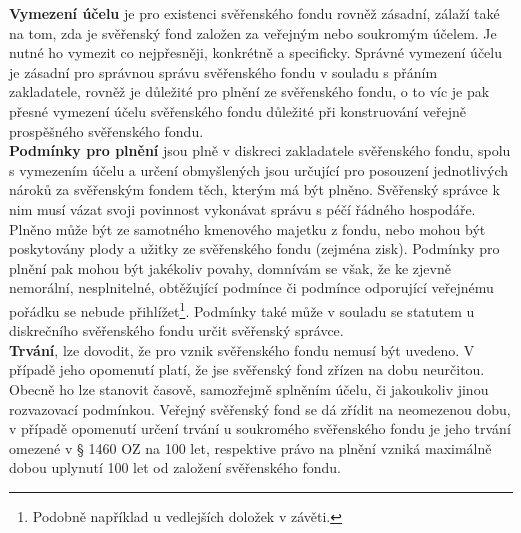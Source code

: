 \documentclass{article}
\begin{document}
\textbf{Vymezení účelu} je pro existenci svěřenského fondu rovněž zásadní, zálaží také na tom, zda je svěřenský fond založen za veřejným nebo soukromým účelem. Je nutné ho vymezit co nejpřesněji, konkrétně a specificky. Správné vymezení účelu je zásadní pro správnou správu svěřenského fondu v souladu s přáním zakladatele, rovněž je důležité pro plnění ze svěřenského fondu, o to víc je pak přesné vymezení účelu svěřenského fondu důležité při konstruování veřejně prospěšného svěřenského fondu.\\

\textbf{Podmínky pro plnění} jsou plně v diskreci zakladatele svěřenského fondu, spolu s vymezením účelu a určení obmyšlených jsou určující pro posouzení jednotlivých nároků za svěřenským fondem těch, kterým má být plněno. Svěřenský správce k nim musí vázat svoji povinnost vykonávat správu s péčí řádného hospodáře. Plněno může být ze samotného kmenového majetku z fondu, nebo mohou být poskytovány plody a užitky ze svěřenského fondu (zejména zisk). Podmínky pro plnění pak mohou být jakékoliv povahy, domnívám se však, že ke zjevně nemorální, nesplnitelné, obtěžující podmínce či podmínce odporující veřejnému pořádku se nebude přihlížet\footnote{Podobně například u vedlejších doložek v závěti.}. Podmínky také může v souladu se statutem u diskrečního svěřenského fondu určit svěřenský správce.\\

\textbf{Trvání}, lze dovodit, že pro vznik svěřenského fondu nemusí být uvedeno. V případě jeho opomenutí platí, že jse svěřenský fond zřízen na dobu neurčitou. Obecně ho lze stanovit časově, samozřejmě splněním účelu, či jakoukoliv jinou rozvazovací podmínkou. Veřejný svěřenský fond se dá zřídit na neomezenou dobu, v případě opomenutí určení trvání u soukromého svěřenského fondu je jeho trvání omezené v § 1460 OZ na 100 let, respektive právo na plnění vzniká maximálně dobou uplynutí 100 let od založení svěřenského fondu.\\
\end{document}
